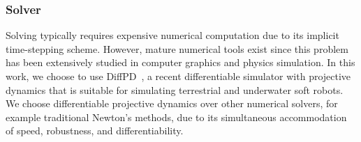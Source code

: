 \subsubsection{Solver} 
Solving  typically requires expensive numerical computation due to its implicit time-stepping scheme. However, mature numerical tools exist since this problem has been extensively studied in computer graphics and physics simulation. In this work, we choose to use DiffPD~\cite{du2021diffpd}, a recent differentiable simulator with projective dynamics that is suitable for simulating terrestrial and underwater soft robots. We choose differentiable projective dynamics over other numerical solvers, for example traditional Newton's methods, due to its simultaneous accommodation of speed, robustness, and differentiability.
